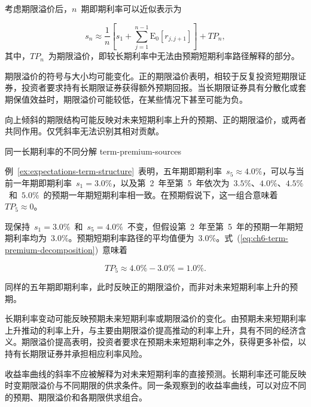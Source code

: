 考虑期限溢价后，$n$~期即期利率可以近似表示为

\begin{equation}
s_n
\approx
\frac{1}{n}
\left[
s_1
+
\sum_{j=1}^{n-1}
\mathrm{E}_0[r_{j,j+1}]
\right]
+
TP_n,
\label{eq:ch6-term-premium-decomposition}
\end{equation}
其中，$TP_n$~为期限溢价，即较长期利率中无法由预期短期利率路径解释的部分。

期限溢价的符号与大小均可能变化。正的期限溢价表明，相较于反复投资短期限证券，投资者要求持有长期限证券获得额外预期回报。当长期限证券具有分散化或套期保值效益时，期限溢价可能较低，在某些情况下甚至可能为负。

向上倾斜的期限结构可能反映对未来短期利率上升的预期、正的期限溢价，或两者共同作用。仅凭斜率无法识别其相对贡献。

\begin{example}
{同一长期利率的不同分解}
{term-premium-sources}

例~\ref{ex:expectations-term-structure}~表明，五年期即期利率~$s_5\approx4.0\%$，可以与当前一年期即期利率~$s_1=3.0\%$，以及第~2~年至第~5~年依次为~$3.5\%$、$4.0\%$、$4.5\%$~和~$5.0\%$~的预期一年期短期利率相一致。在预期假说下，这一组合意味着~$TP_5\approx0$。

现保持~$s_1=3.0\%$~和~$s_5=4.0\%$~不变，但假设第~2~年至第~5~年的预期一年期短期利率均为~$3.0\%$。预期短期利率路径的平均值便为~3.0\%。式~(\ref{eq:ch6-term-premium-decomposition})~意味着

\[
TP_5
\approx
4.0\%-3.0\%
=
1.0\%.
\]

同样的五年期即期利率，此时反映正的期限溢价，而非对未来短期利率上升的预期。

\end{example}

长期利率变动可能反映预期未来短期利率或期限溢价的变化。由预期未来短期利率上升推动的利率上升，与主要由期限溢价提高推动的利率上升，具有不同的经济含义。期限溢价提高表明，投资者要求在预期未来短期利率之外，获得更多补偿，以持有长期限证券并承担相应利率风险。

\begin{tcolorbox}[
  enhanced,
  breakable,
  colback=white,
  colframe=FinanceBlue,
  boxrule=0.7pt,
  sharp corners,
  borderline west={2.2pt}{0pt}{FinanceBlue},
  title=\textbf{金融视角：解读收益率曲线},
  coltitle=white,
  colbacktitle=FinanceBlue,
  fonttitle=\bfseries,
  before skip=1.2em,
  after skip=1.2em
]

收益率曲线的斜率不应被解释为对未来短期利率的直接预测。长期利率还可能反映时变期限溢价与不同期限的供求条件。同一条观察到的收益率曲线，可以对应不同的预期、期限溢价和各期限供求组合。
\end{tcolorbox}

